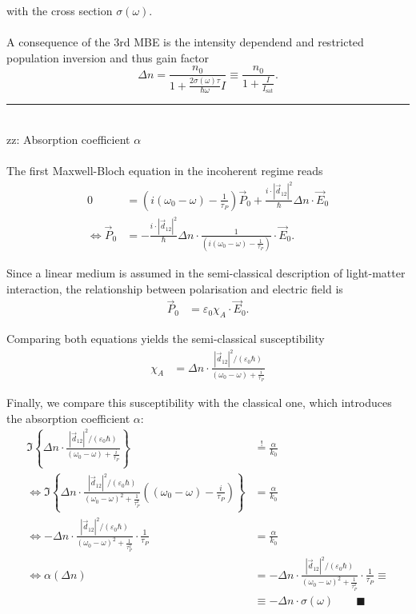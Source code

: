 \documentclass{article}
\newcommand{\lr}[1]{\left(#1\right)}
\newcommand{\lrschweif}[1]{\left\{#1\right\}}
\begin{document}
with the cross section $\sigma(\omega)$.\\
\\
A consequence of the 3rd MBE is the intensity dependend and restricted population inversion and thus gain factor
	\begin{equation}
		\Delta n = \frac{n_0}{ 1 + \frac{2\sigma(\omega)\tau}{\hbar\omega} I } \equiv \frac{n_0}{ 1 + \frac{I}{I_\text{sat}} }.
	\end{equation}


\newpage


{\color{violet}
\hrule
	\\
	zz: Absorption coefficient $\alpha$\\
	\\
	The first Maxwell-Bloch equation in the incoherent regime reads
		\begin{align*}
			0 &= \lr{ i(\omega_0 - \omega) - \frac{1}{\tau_P} } \vec{P}_0 + \frac{i\cdot|\vec{d}_{12}|^2}{\hbar} \Delta n \cdot \vec{E}_0 \\
			\Leftrightarrow \vec{P}_0 &= -\frac{i \cdot |\vec{d}_{12}|^2}{\hbar} \Delta n \cdot \frac{1}{ \lr{ i(\omega_0 - \omega) - \frac{1}{\tau_P} } }\cdot \vec{E}_0.
		\end{align*}

	Since a linear medium is assumed in the semi-classical description of light-matter interaction, the relationship between polarisation and electric field is
		\begin{align*}
			\vec{P}_0 &= \varepsilon_0 \chi_A \cdot \vec{E}_0.
		\end{align*}
	
	Comparing both equations yields the semi-classical susceptibility
		\begin{align*}
			\chi_A &= \Delta n \cdot \frac{ |\vec{d}_{12}|^2 / (\varepsilon_0 \hbar) }{(\omega_0 - \omega) + \frac{i}{\tau_P}} 
		\end{align*}

	Finally, we compare this susceptibility with the classical one, which introduces the absorption coefficient $\alpha$:
		\begin{align*}
			\Im \lrschweif{ \Delta n \cdot \frac{ |\vec{d}_{12}|^2 / (\varepsilon_0 \hbar) }{(\omega_0 - \omega) + \frac{i}{\tau_P}} } &\stackrel{!}{=} \frac{\alpha}{k_0} \\
			\Leftrightarrow \Im \lrschweif{ \Delta n \cdot \frac{ |\vec{d}_{12}|^2 / (\varepsilon_0 \hbar) }{ (\omega_0 - \omega)^2 + \frac{1}{\tau_P^2} } \lr{ (\omega_0 - \omega) - \frac{i}{\tau_P} } } &= \frac{\alpha}{k_0} \\
			\Leftrightarrow -\Delta n \cdot \frac{ |\vec{d}_{12}|^2 / (\varepsilon_0 \hbar) }{(\omega_0 - \omega)^2 + \frac{1}{\tau_P^2}} \cdot \frac{1}{\tau_P} &= \frac{\alpha}{k_0} \\
			\Leftrightarrow \alpha(\Delta n) &= -\Delta n \cdot \frac{ |\vec{d}_{12}|^2 / (\varepsilon_0 \hbar) }{(\omega_0 - \omega)^2 + \frac{1}{\tau_P^2}} \cdot \frac{1}{\tau_P} \equiv \\
			&\equiv -\Delta n \cdot \sigma(\omega) \qquad \blacksquare
		\end{align*}


}
\end{document}
